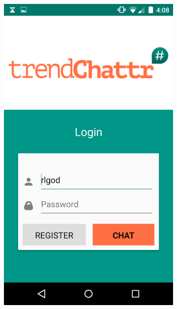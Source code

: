 \documentclass[11pt,english,numbers=endperiod,parskip=half]{scrartcl}
\begin{document}
\begin{figure}[H]
\begin{subfigure}{.5\textwidth}
      \includegraphics[width=.7\linewidth]{images/ss4.png}
    \end{subfigure}
  \end{figure}
\end{document}
